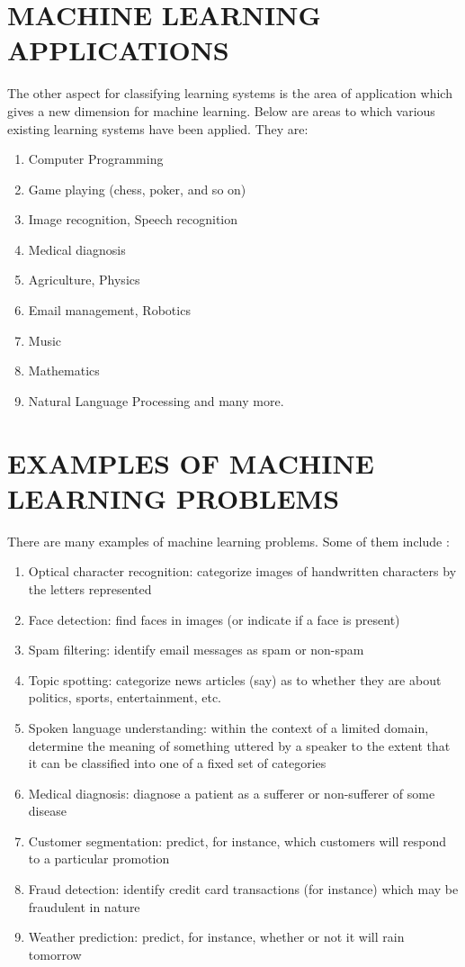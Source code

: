 \documentclass[12pt]{article}
\begin{document}
{\section{MACHINE LEARNING APPLICATIONS}
The other aspect for classifying learning systems is the area of application which gives a new dimension for machine learning\cite{t}. Below are areas to which various existing learning systems have been applied. They are:
\begin{enumerate}
\item Computer Programming
\item Game playing (chess, poker, and so on)
\item Image recognition, Speech recognition
\item Medical diagnosis
\item Agriculture, Physics
\item Email management, Robotics
\item Music
\item Mathematics
\item Natural Language Processing and many more.
\end{enumerate}

\section{EXAMPLES OF MACHINE LEARNING PROBLEMS}
There are many examples of machine learning problems. Some of them include :
\begin{enumerate}
\item Optical character recognition: categorize images of handwritten characters by the letters represented
\item Face detection: find faces in images (or indicate if a face is present)
\item Spam filtering: identify email messages as spam or non-spam
\item Topic spotting: categorize news articles (say) as to whether they are about politics, sports, entertainment, etc.
\item Spoken language understanding: within the context of a limited domain, determine the meaning of something uttered by a speaker to the extent that it can be classified into one of a fixed set of categories
\item Medical diagnosis: diagnose a patient as a sufferer or non-sufferer of some disease
\item Customer segmentation: predict, for instance, which customers will respond to a particular promotion
\item Fraud detection: identify credit card transactions (for instance) which may be fraudulent in nature
\item Weather prediction: predict, for instance, whether or not it will rain tomorrow
\end{enumerate}

}
\end{document}
